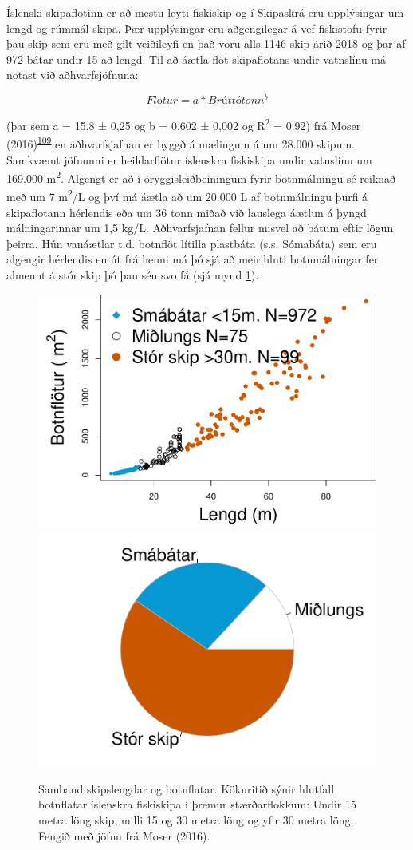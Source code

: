 \documentclass[icelandic,]{book}
\begin{document}
Íslenski skipaflotinn er að mestu leyti fiskiskip og í Skipaskrá eru upplýsingar um lengd og rúmmál skipa. Þær upplýsingar eru aðgengilegar á vef \href{http://www.fiskistofa.is/}{fiskistofu} fyrir þau skip sem eru með gilt veiðileyfi en það voru alls 1146 skip árið 2018 og þar af 972 bátar undir 15 að lengd. Til að áætla flöt skipaflotans undir vatnslínu má notast við aðhvarfsjöfnuna:

\begin{equation} 
  Flötur = a*Brúttótonn^b
  \label{eq:WSA}
\end{equation}

(þar sem a = 15,8 ± 0,25 og b = 0,602 ± 0,002 og R\textsuperscript{2} = 0.92) frá Moser (2016)\textsuperscript{\protect\hyperlink{ref-Moser2016}{109}} en aðhvarfsjafnan er byggð á mælingum á um 28.000 skipum. Samkvæmt jöfnunni er heildarflötur íslenskra fiskiskipa undir vatnslínu um 169.000 m\textsuperscript{2}. Algengt er að í öryggisleiðbeiningum fyrir botnmálningu sé reiknað með um 7 m\textsuperscript{2}/L og því má áætla að um 20.000 L af botnmálningu þurfi á skipaflotann hérlendis eða um 36 tonn miðað við lauslega áætlun á þyngd málningarinnar um 1,5 kg/L. Aðhvarfsjafnan fellur misvel að bátum eftir lögun þeirra. Hún vanáætlar t.d. botnflöt lítilla plastbáta (s.s. Sómabáta) sem eru algengir hérlendis en út frá henni má þó sjá að meirihluti botnmálningar fer almennt á stór skip þó þau séu svo fá (sjá mynd \ref{fig:slippur}).

\begin{figure}[H]

{\centering \includegraphics[width=0.5\linewidth]{_bookdown_files/OrplastHaf_files/figure-latex/slippur-1} \includegraphics[width=0.5\linewidth]{_bookdown_files/OrplastHaf_files/figure-latex/slippur-2} 

}

\caption{Samband skipslengdar og botnflatar. Kökuritið sýnir hlutfall botnflatar íslenskra fiskiskipa í þremur stærðarflokkum: Undir 15 metra löng skip, milli 15 og 30 metra löng og yfir 30 metra löng. Fengið með jöfnu frá Moser (2016).}\label{fig:slippur}
\end{figure}
\end{document}
